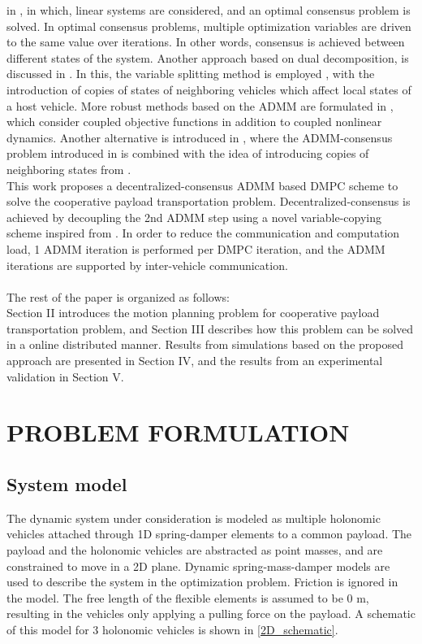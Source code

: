 \documentclass[letterpaper, 10 pt, conference]{ieeeconf}
\begin{document}
 in \cite{c10}, in which, linear systems are considered, and an optimal consensus problem is solved. In optimal consensus problems, multiple optimization variables are driven to the
 same value over iterations. In other words, consensus is achieved between different states of the system. Another approach based on dual decomposition, is discussed in \cite{c11}. In this, the variable splitting method is employed \cite{c8}, with the introduction of copies of states of neighboring vehicles which affect local states of a host vehicle. More robust methods based on the ADMM are formulated in \cite{c12}, which consider coupled objective functions in addition to coupled nonlinear dynamics. Another alternative is introduced in \cite{c13}, where the
 ADMM-consensus problem introduced in \cite{c14} is combined with the idea of introducing copies of neighboring states from \cite{c11}.
 \\
 \indent
 This work proposes a decentralized-consensus ADMM based DMPC scheme to solve the cooperative payload transportation problem. Decentralized-consensus is achieved by decoupling the 2nd ADMM step using a novel variable-copying scheme inspired from \cite{c9}. In order to reduce the communication and computation load, 1 ADMM iteration is performed per DMPC iteration, and the ADMM iterations are supported by inter-vehicle communication.
 \\ \\ \indent
 The rest of the paper is organized as follows: \\
Section  II  introduces  the  motion  planning  problem  for
cooperative payload transportation problem, and Section III describes how
this  problem  can  be  solved  in  a  online distributed manner. Results from simulations based on the proposed approach are presented in Section IV, and the results from an experimental validation in Section V.
\section{PROBLEM FORMULATION}
\subsection{System model}
The dynamic system under consideration is modeled as multiple holonomic vehicles attached through 1D spring-damper elements to a common payload. The payload and the holonomic vehicles are abstracted as point masses, and are constrained to move in a 2D plane. Dynamic spring-mass-damper models are used to describe the system in the optimization problem. Friction is ignored in the model. The free length of the flexible elements is assumed to be $0$ m, resulting in the vehicles only applying a pulling force on the payload. A schematic of this model for 3 holonomic vehicles is shown in \ref{2D_schematic}.
\end{document}
